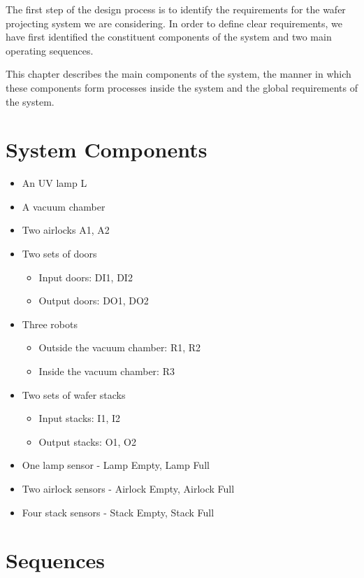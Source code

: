 
The first step of the design process is to identify the requirements for the wafer projecting system we are considering. In order to define clear requirements, we have first identified the constituent components of the system and two main operating sequences.

This chapter describes the main components of the system, the manner in which these components form processes inside the system and the global requirements of the system.

\section{System Components}

\begin{itemize}
\item An UV lamp L
\item A vacuum chamber
\item Two airlocks A1, A2

\item Two sets of doors
    \begin{itemize}
    \item Input doors: DI1, DI2
    \item Output doors: DO1, DO2
    \end{itemize}

\item Three robots
    \begin{itemize}
    \item Outside the vacuum chamber: R1, R2
    \item Inside the vacuum chamber: R3
    \end{itemize}

\item Two sets of wafer stacks
    \begin{itemize}
    \item Input stacks: I1, I2
    \item Output stacks: O1, O2
    \end{itemize}
    
\item One lamp sensor - Lamp Empty, Lamp Full
\item Two airlock sensors - Airlock Empty, Airlock Full
\item Four stack sensors - Stack Empty, Stack Full
 
\end{itemize}

\section{Sequences}

